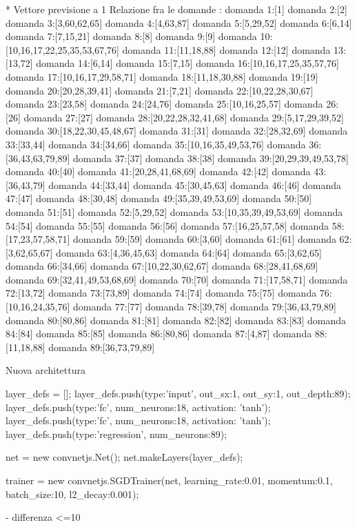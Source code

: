 * Vettore previsione a 1
Relazione fra le domande :
domanda 1:[1]
domanda 2:[2]
domanda 3:[3,60,62,65]
domanda 4:[4,63,87]
domanda 5:[5,29,52]
domanda 6:[6,14]
domanda 7:[7,15,21]
domanda 8:[8]
domanda 9:[9]
domanda 10:[10,16,17,22,25,35,53,67,76]
domanda 11:[11,18,88]
domanda 12:[12]
domanda 13:[13,72]
domanda 14:[6,14]
domanda 15:[7,15]
domanda 16:[10,16,17,25,35,57,76]
domanda 17:[10,16,17,29,58,71]
domanda 18:[11,18,30,88]
domanda 19:[19]
domanda 20:[20,28,39,41]
domanda 21:[7,21]
domanda 22:[10,22,28,30,67]
domanda 23:[23,58]
domanda 24:[24,76]
domanda 25:[10,16,25,57]
domanda 26:[26]
domanda 27:[27]
domanda 28:[20,22,28,32,41,68]
domanda 29:[5,17,29,39,52]
domanda 30:[18,22,30,45,48,67]
domanda 31:[31]
domanda 32:[28,32,69]
domanda 33:[33,44]
domanda 34:[34,66]
domanda 35:[10,16,35,49,53,76]
domanda 36:[36,43,63,79,89]
domanda 37:[37]
domanda 38:[38]
domanda 39:[20,29,39,49,53,78]
domanda 40:[40]
domanda 41:[20,28,41,68,69]
domanda 42:[42]
domanda 43:[36,43,79]
domanda 44:[33,44]
domanda 45:[30,45,63]
domanda 46:[46]
domanda 47:[47]
domanda 48:[30,48]
domanda 49:[35,39,49,53,69]
domanda 50:[50]
domanda 51:[51]
domanda 52:[5,29,52]
domanda 53:[10,35,39,49,53,69]
domanda 54:[54]
domanda 55:[55]
domanda 56:[56]
domanda 57:[16,25,57,58]
domanda 58:[17,23,57,58,71]
domanda 59:[59]
domanda 60:[3,60]
domanda 61:[61]
domanda 62:[3,62,65,67]
domanda 63:[4,36,45,63]
domanda 64:[64]
domanda 65:[3,62,65]
domanda 66:[34,66]
domanda 67:[10,22,30,62,67]
domanda 68:[28,41,68,69]
domanda 69:[32,41,49,53,68,69]
domanda 70:[70]
domanda 71:[17,58,71]
domanda 72:[13,72]
domanda 73:[73,89]
domanda 74:[74]
domanda 75:[75]
domanda 76:[10,16,24,35,76]
domanda 77:[77]
domanda 78:[39,78]
domanda 79:[36,43,79,89]
domanda 80:[80,86]
domanda 81:[81]
domanda 82:[82]
domanda 83:[83]
domanda 84:[84]
domanda 85:[85]
domanda 86:[80,86]
domanda 87:[4,87]
domanda 88:[11,18,88]
domanda 89:[36,73,79,89]

Nuova architettura

layer_defs = [];
layer_defs.push({type:'input', out_sx:1, out_sy:1, out_depth:89});
layer_defs.push({type:'fc', num_neurons:18, activation: 'tanh'});
layer_defs.push({type:'fc', num_neurons:18, activation: 'tanh'});
layer_defs.push({type:'regression', num_neurons:89});

net = new convnetjs.Net();
net.makeLayers(layer_defs);

trainer = new convnetjs.SGDTrainer(net, {learning_rate:0.01, momentum:0.1, batch_size:10, l2_decay:0.001});

- differenza <=10

